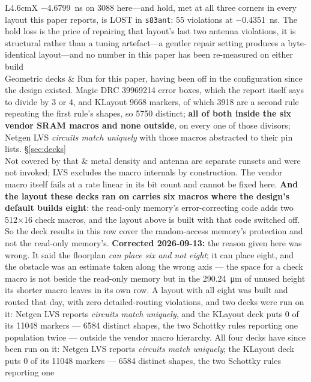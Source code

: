 \documentclass[11pt,a4paper]{article}
\begin{document}
\begin{table}[htbp]
\begin{tabularx}{\textwidth}{L{4.6cm}X}
{$-$\SI{4.6799}{\nano\second} on \num{3088} here---and hold, met at
all three corners in every layout this paper reports, is LOST in
\texttt{s83ant}: \num{55} violations at $-$\SI{0.4351}{\nano\second}.
The hold loss is the price of repairing that layout's last two antenna
violations, it is structural rather than a tuning artefact---a gentler
repair setting produces a byte-identical layout---and no number in this
paper has been re-measured on either build}
\\
Geometric decks & Run for this paper, having been off in the
configuration since the design existed. Magic DRC \num{39969214} error
boxes, which the report itself says to divide by 3 or 4, and KLayout
\num{9668} markers, of which \num{3918} are a second rule repeating the
first rule's shapes, so \num{5750} distinct; \textbf{all of both inside
the six vendor SRAM macros and none outside}, on every one of those
divisors; Netgen LVS \emph{circuits match uniquely}
with those macros abstracted to their pin lists. \S\ref{sec:decks} \\
Not covered by that & metal density and antenna are separate runsets and
were not invoked; LVS excludes the macro internals by construction. The
vendor macro itself fails at a rate linear in its bit count and cannot be
fixed here. \textbf{And the layout these decks ran on carries six macros where the
design's default builds eight}: the read-only memory's error-correcting
code adds two \num{512}$\times$\num{16} check macros, and the layout
above is built with that code switched off. So the deck results in this
row cover the random-access memory's protection and not the read-only
memory's. \textbf{Corrected \mbox{2026-09-13}:} the reason given here
was wrong. It said the floorplan \emph{can place six and not eight};
it can place eight, and the obstacle was an estimate taken along the
wrong axis --- the space for a check macro is not beside the read-only
memory but in the \SI{290.24}{\micro\meter} of unused height its
shorter macro leaves in its own row. A layout with all eight was built
and routed that day, with zero detailed-routing violations, and two
decks were run on it: Netgen LVS reports \emph{circuits match
uniquely}, and the KLayout deck puts \num{0} of its \num{11048}
markers --- \num{6584} distinct shapes, the two Schottky rules
reporting one population twice --- outside the vendor macro
hierarchy. All four decks
have since been run on it: Netgen LVS reports \emph{circuits match
uniquely}; the KLayout deck puts \num{0} of its \num{11048} markers
--- \num{6584} distinct shapes, the two Schottky rules reporting one

\end{tabularx}
\end{table}
\end{document}
